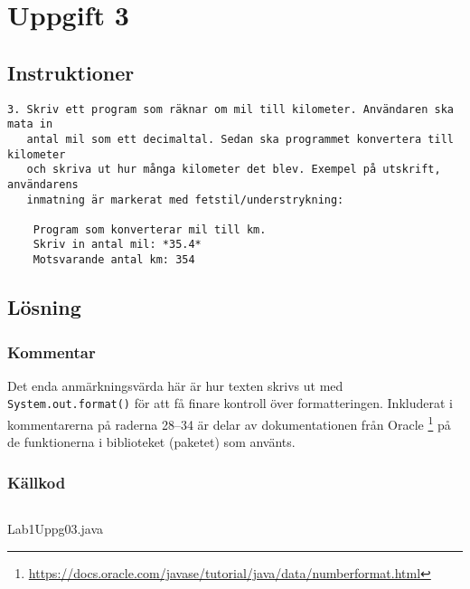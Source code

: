 \section{Uppgift 3}\label{uppgift-3}

\subsection{Instruktioner}
\begin{verbatim}
3. Skriv ett program som räknar om mil till kilometer. Användaren ska mata in
   antal mil som ett decimaltal. Sedan ska programmet konvertera till kilometer
   och skriva ut hur många kilometer det blev. Exempel på utskrift, användarens
   inmatning är markerat med fetstil/understrykning:

    Program som konverterar mil till km.
    Skriv in antal mil: *35.4*
    Motsvarande antal km: 354
\end{verbatim}

\subsection{Lösning}
\subsubsection{Kommentar}
Det enda anmärkningsvärda här är hur texten skrivs ut med
\texttt{System.out.format()} för att få finare kontroll över formatteringen.
Inkluderat i kommentarerna på raderna \numrange{28}{34} är delar av
dokumentationen från Oracle
\footnote{\url{https://docs.oracle.com/javase/tutorial/java/data/numberformat.html}}
på de funktionerna i biblioteket (paketet) som använts.


\subsubsection{Källkod}\label{uppgift-3_src}
    \inputminted[linenos]{java}{src/Lab1Uppg03.java}
    \caption{Lab1Uppg03.java}
    \label{Uppg3src}

